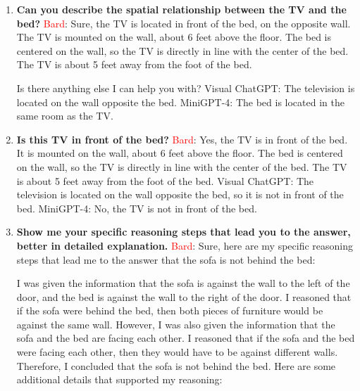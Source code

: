 \begin{enumerate}
    \item \textbf{Can you describe the spatial relationship between the TV and the bed?}
    \subitem \textcolor{Red}{Bard}: 
    Sure, the TV is located in front of the bed, on the opposite wall. The TV is mounted on the wall, about 6 feet above the floor. The bed is centered on the wall, so the TV is directly in line with the center of the bed. The TV is about 5 feet away from the foot of the bed.

    Is there anything else I can help you with?
    \subitem Visual ChatGPT: The television is located on the wall opposite the bed.
    \subitem MiniGPT-4: The bed is located in the same room as the TV.
    \item \textbf{Is this TV in front of the bed?}
    \subitem \textcolor{Red}{Bard}: 
    Yes, the TV is in front of the bed. It is mounted on the wall, about 6 feet above the floor. The bed is centered on the wall, so the TV is directly in line with the center of the bed. The TV is about 5 feet away from the foot of the bed.
    \subitem Visual ChatGPT: The television is located on the wall opposite the bed, so it is not in front of the bed.
    \subitem MiniGPT-4: No, the TV is not in front of the bed.
    \item \textbf{Show me your specific reasoning steps that lead you to the answer, better in detailed explanation.}
    \subitem \textcolor{Red}{Bard}: 
    Sure, here are my specific reasoning steps that lead me to the answer that the sofa is not behind the bed:

    I was given the information that the sofa is against the wall to the left of the door, and the bed is against the wall to the right of the door.
    I reasoned that if the sofa were behind the bed, then both pieces of furniture would be against the same wall.
    However, I was also given the information that the sofa and the bed are facing each other.
    I reasoned that if the sofa and the bed were facing each other, then they would have to be against different walls.
    Therefore, I concluded that the sofa is not behind the bed.
    Here are some additional details that supported my reasoning:


\end{enumerate}
